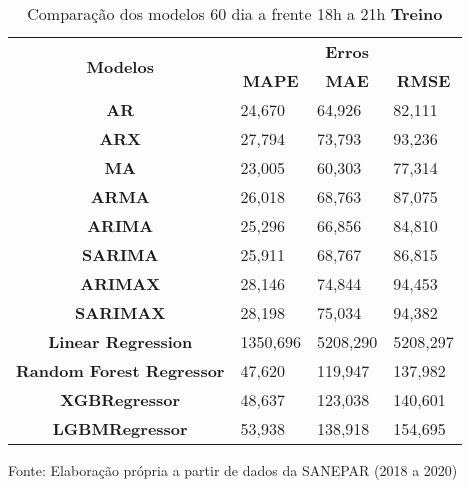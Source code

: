 \begin{table}[H]
	\centering
	\caption{Comparação dos modelos 60 dia a frente 18h a 21h \textbf{Treino} }\label{tb:60-18trn}
	\begin{tabular}{@{}clll@{}}
		\toprule
		\multirow{2}{*}{\textbf{Modelos}} & \multicolumn{3}{c}{\textbf{Erros}}                                                                       \\ \cmidrule(l){2-4} 
		& \multicolumn{1}{c}{\textbf{MAPE}} & \multicolumn{1}{c}{\textbf{MAE}} & \multicolumn{1}{c}{\textbf{RMSE}} \\ \hline
\textbf{AR}                       & 24,670                            & 64,926                           & 82,111                            \\
\textbf{ARX}                      & 27,794                            & 73,793                           & 93,236                            \\
\textbf{MA}                       & 23,005                            & 60,303                           & 77,314                            \\
\textbf{ARMA}                     & 26,018                            & 68,763                           & 87,075                            \\
\textbf{ARIMA}                    & 25,296                            & 66,856                           & 84,810                            \\
\textbf{SARIMA}                   & 25,911                            & 68,767                           & 86,815                            \\
\textbf{ARIMAX}                   & 28,146                            & 74,844                           & 94,453                            \\
\textbf{SARIMAX}                  & 28,198                            & 75,034                           & 94,382                            \\
\textbf{Linear Regression}        & 1350,696                          & 5208,290                         & 5208,297                          \\
\textbf{Random Forest Regressor}  & 47,620                            & 119,947                          & 137,982                           \\
\textbf{XGBRegressor}             & 48,637                            & 123,038                          & 140,601                           \\
\textbf{LGBMRegressor}            & 53,938                            & 138,918                          & 154,695                           \\ \bottomrule
	\end{tabular}

Fonte: Elaboração própria a partir de dados da SANEPAR (2018 a 2020)
\end{table}

